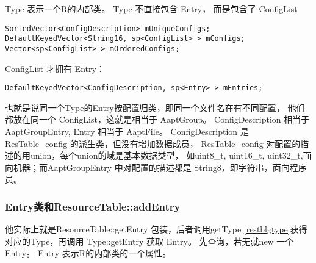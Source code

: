 \documentclass[a4paper,11pt]{article}
\begin{document}
Type 表示一个R的内部类。
Type 不直接包含 Entry， 而是包含了 ConfigList
\begin{lstlisting}
SortedVector<ConfigDescription> mUniqueConfigs;
DefaultKeyedVector<String16, sp<ConfigList> > mConfigs;
Vector<sp<ConfigList> > mOrderedConfigs;
\end{lstlisting}
ConfigList 才拥有 Entry：
\begin{lstlisting}
DefaultKeyedVector<ConfigDescription, sp<Entry> > mEntries;
\end{lstlisting}
也就是说同一个Type的Entry按配置归类，即同一个文件名在有不同配置，
他们都放在同一个 ConfigList，这就是相当于 AaptGroup。
ConfigDescription 相当于 AaptGroupEntry, Entry 相当于 AaptFile。
ConfigDescription 是 ResTable_config 的派生类，但没有增加数据成员，
ResTable_config 对配置的描述的用union，每个union的域是基本数据类型，
如uint8_t, uint16_t, uint32_t,面向机器；而AaptGroupEntry 中对配置的描述都是
String8，即字符串，面向程序员。

\subsubsection{Entry类和ResourceTable::addEntry}\label{tableaddentry}
他实际上就是ResourceTable::getEntry 包装，后者调用getType
\cref{restblgtype}获得对应的Type，再调用 Type::getEntry
获取 Entry。 先查询，若无就new 一个 Entry。
Entry 表示R的内部类的一个属性。
\end{document}

